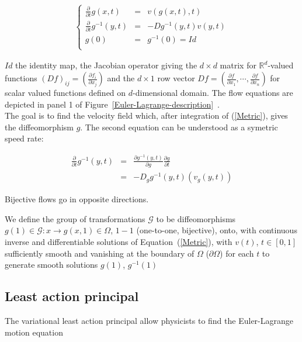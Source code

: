 \documentclass[final, paper=letter,5p,times,twocolumn]{elsarticle}
\theoremstyle{definition}
\begin{document}
{\begin{eqnarray}
\left \lbrace
\begin{array}{rcl}
\frac{\partial}{\partial t}g(x,t) &=& v(g(x,t),t) \\
\frac{\partial}{\partial t}g^{-1}(y,t) &=& -Dg^{-1}(y,t)v(y,t) \\
g(0) &=& g^{-1}(0) = Id \\
\end{array}
\right .
\label{Metric}
\end{eqnarray}

$Id$ the identity map, the Jacobian operator giving the $d \times d$ matrix for $\mathbb{R}^{d}$-valued functions $(Df)_{ij} = (\frac{\partial f_{i}}{\partial x_{j}})$ and the $d \times 1$ row vector $Df = (\frac{\partial f}{\partial x_{1}}, \cdots, \frac{\partial f}{\partial x_{n}} )$ for scalar valued functions defined on $d$-dimensional domain. The flow equations are depicted in panel 1 of Figure~\ref{Euler-Lagrange-description}~\cite{pmid12117763}.\\
The goal is to find the velocity field which, after integration of (\ref{Metric}), gives the diffeomorphism $g$. The second equation can be understood as a symetric speed rate:

\begin{eqnarray*}
\frac{\partial}{\partial t}g^{-1}(y,t) & = & \frac{\partial g^{-1}(y,t)}{\partial g}\frac{\partial g}{\partial t} \\
& = & - D_{g} g^{-1}(y,t) (v_{g}(y,t))
\end{eqnarray*}

Bijective flows go in opposite directions.

\begin{definition}
We define the group of transformations $\mathcal{G}$ to be diffeomorphisms $g(1) \in \mathcal{G}: x \rightarrow g(x, 1) \in \Omega$, $1-1$ (one-to-one, bijective), onto, with continuous inverse and differentiable solutions of Equation~(\ref{Metric}), with $v(t)$, $t \in [0, 1]$ sufficiently smooth and vanishing at the boundary of $\Omega$ ($\partial \Omega$) for each $t$ to generate smooth solutions $g(1)$, $g^{-1}(1)$
\end{definition}

\subsection{Least action principal}

The variational least action principal allow physicists to find the Euler-Lagrange motion equation

}
\end{document}
